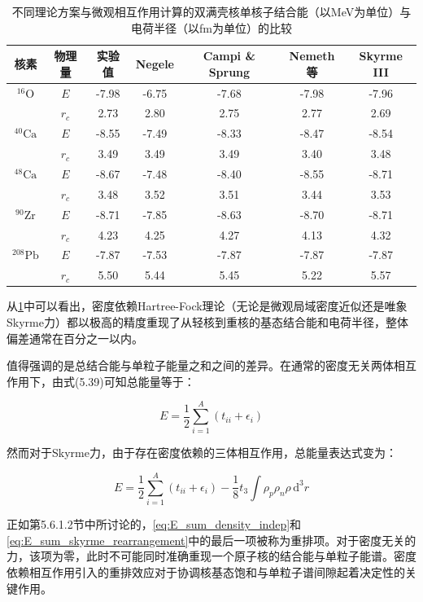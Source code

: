 \begin{table}[H]
\begin{centering}
\caption{\label{tab:hf_results_comparison}不同理论方案与微观相互作用计算的双满壳核单核子结合能（以MeV为单位）与电荷半径（以fm为单位）的比较}
\par\end{centering}
\centering{}%
\begin{tabular}{|c|c|c|c|c|c|c|}
\hline 
核素 & 物理量 & 实验值 & Negele \cite{Ne70} & Campi \& Sprung \cite{CS72} & Nemeth等 \cite{NMH73} & Skyrme III \cite{BFG75}\tabularnewline
\hline 
\hline 
$^{16}\mathrm{O}$ & $E$ & -7.98 & -6.75 & -7.68 & -7.98 & -7.96\tabularnewline
 & $r_{c}$ & 2.73 & 2.80 & 2.75 & 2.77 & 2.69\tabularnewline
\hline 
$^{40}\mathrm{Ca}$ & $E$ & -8.55 & -7.49 & -8.33 & -8.47 & -8.54\tabularnewline
 & $r_{c}$ & 3.49 & 3.49 & 3.49 & 3.40 & 3.48\tabularnewline
\hline 
$^{48}\mathrm{Ca}$ & $E$ & -8.67 & -7.48 & -8.40 & -8.55 & -8.71\tabularnewline
 & $r_{c}$ & 3.48 & 3.52 & 3.51 & 3.44 & 3.53\tabularnewline
\hline 
$^{90}\mathrm{Zr}$ & $E$ & -8.71 & -7.85 & -8.63 & -8.70 & -8.71\tabularnewline
 & $r_{c}$ & 4.23 & 4.25 & 4.27 & 4.13 & 4.32\tabularnewline
\hline 
$^{208}\mathrm{Pb}$ & $E$ & -7.87 & -7.53 & -7.87 & -7.87 & -7.87\tabularnewline
 & $r_{c}$ & 5.50 & 5.44 & 5.45 & 5.22 & 5.57\tabularnewline
\hline 
\end{tabular}
\end{table}

从\ref{tab:hf_results_comparison}中可以看出，密度依赖Hartree-Fock理论（无论是微观局域密度近似还是唯象Skyrme力）都以极高的精度重现了从轻核到重核的基态结合能和电荷半径，整体偏差通常在百分之一以内。

值得强调的是总结合能与单粒子能量之和之间的差异。在通常的密度无关两体相互作用下，由式(5.39)可知总能量等于：

\begin{equation}
E=\frac{1}{2}\sum^{A}_{i=1}\left(t_{ii}+\epsilon_{i}\right)\label{eq:E_sum_density_indep}
\end{equation}

然而对于Skyrme力，由于存在密度依赖的三体相互作用，总能量表达式变为：

\begin{equation}
E=\frac{1}{2}\sum^{A}_{i=1}\left(t_{ii}+\epsilon_{i}\right)-\frac{1}{8}t_{3}\int\rho_{p}\rho_{n}\rho\,\mathrm{d}^{3}r\label{eq:E_sum_skyrme_rearrangement}
\end{equation}

正如第5.6.1.2节中所讨论的，\ref{eq:E_sum_density_indep}和\ref{eq:E_sum_skyrme_rearrangement}中的最后一项被称为重排项。对于密度无关的力，该项为零，此时不可能同时准确重现一个原子核的结合能与单粒子能谱。密度依赖相互作用引入的重排效应对于协调核基态饱和与单粒子谱间隙起着决定性的关键作用。

